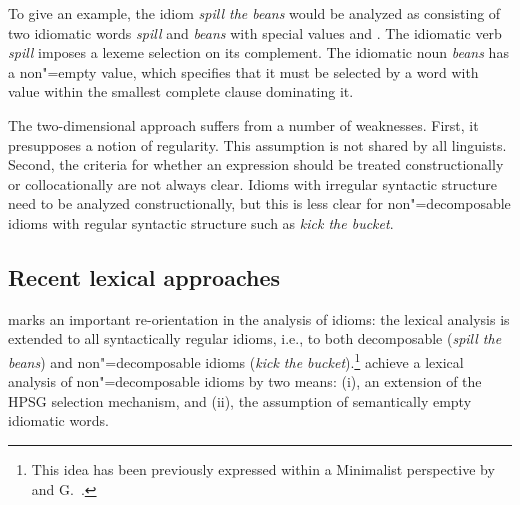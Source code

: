 \documentclass[output=paper,biblatex,babelshorthands,newtxmath,draftmode,colorlinks,citecolor=brown]{langscibook}
\begin{document}
To give an example, the idiom \emph{spill the beans} would be analyzed as consisting of two
idiomatic words \emph{spill} and \emph{beans} with special  values  and
\mbox{}. The idiomatic verb \emph{spill} imposes a lexeme selection on its
complement. The idiomatic noun \emph{beans} has a non"=empty  value, which specifies that
it must be selected by a word with  value  within the smallest complete
clause dominating it.


The two-dimensional approach suffers from a number of weaknesses.  First, it presupposes a notion of
regularity. This assumption is not shared by all linguists.  Second, the criteria for whether an
expression should be treated constructionally or collocationally are not always clear.  Idioms with
irregular syntactic structure need to be analyzed constructionally, but this is less clear for
non"=decomposable idioms with regular syntactic structure such as \emph{kick the bucket}.



\subsection{Recent lexical approaches}
\label{Sec-RecentLexical}\label{idioms:recent-lexical-approaches}

\largerpage
\enlargethispage{3pt}
\citet{KSF2015a} marks an important re-orientation in the analysis of idioms: the lexical analysis
is extended to all syntactically regular idioms, i.e., to both decomposable (\emph{spill the beans})
and non"=decomposable idioms (\emph{kick the bucket}).\footnote{This idea has been previously
  expressed within a Minimalist perspective by  and G.\ .  }
%
\citet{KSF2015a} achieve a lexical analysis of non"=decomposable idioms by two means: (i), an
extension of the HPSG selection mechanism, and (ii), the assumption of semantically empty idiomatic
words.  
\end{document}
